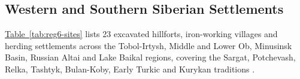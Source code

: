 \IfFileExists{../../_shared/template/intellte.cls}{\documentclass[10pt,onecolumn]{../../_shared/template/intellte}}{\documentclass[10pt,onecolumn]{intellte}}
\providecommand{\crdxref}[2]{\hyperref[#2]{#1~\ref*{#2}}}
\begin{document}
\subsection{Western and Southern Siberian
Settlements}\label{western-and-southern-siberian-settlements}

\crdxref{Table}{tab:reg6-sites} lists 23 excavated hillforts,
iron-working villages and herding settlements across the Tobol-Irtysh,
Middle and Lower Ob, Minusinsk Basin, Russian Altai and Lake Baikal
regions, covering the Sargat, Potchevash, Relka, Tashtyk, Bulan-Koby,
Early Turkic and Kurykan traditions
.
\end{document}
